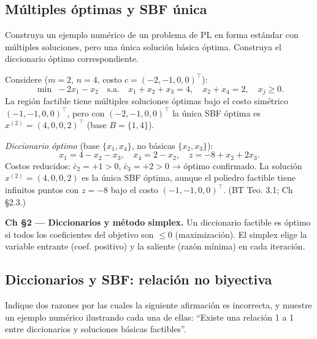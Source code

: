 \documentclass[12pt]{article}
\theoremstyle{plain}
\begin{document}
\bigskip

\subsection{Múltiples óptimas y SBF única}

Construya un ejemplo numérico de un problema de PL en forma estándar con múltiples
soluciones, pero una única solución básica óptima. Construya el diccionario óptimo
correspondiente.

\begin{solucion}

Considere ($m=2$, $n=4$, costo $c=(-2,-1,0,0)^\top$):
\[
\min\; -2x_1 - x_2 \quad\text{s.a.}\quad x_1+x_2+x_3=4,\quad x_2+x_4=2,\quad x_j\geq 0.
\]
La región factible tiene múltiples soluciones óptimas bajo el costo simétrico $(-1,-1,0,0)^\top$, pero con $(-2,-1,0,0)^\top$ la única SBF óptima es $x^{(2)}=(4,0,0,2)^\top$ (base $B=\{1,4\}$).

\noindent\textit{Diccionario óptimo} (base $\{x_1,x_4\}$, no básicas $\{x_2,x_3\}$):
\[
x_1 = 4 - x_2 - x_3, \quad x_4 = 2 - x_2, \quad z = -8 + x_2 + 2x_3.
\]
Costos reducidos: $\bar{c}_2 = +1 > 0$, $\bar{c}_3 = +2 > 0$ → óptimo confirmado. La solución $x^{(2)}=(4,0,0,2)$ es la única SBF óptima, aunque el poliedro factible tiene infinitos puntos con $z=-8$ bajo el costo $(-1,-1,0,0)^\top$. (BT Teo. 3.1; Ch §2.3.)

\end{solucion}

\begin{teofund}
\textbf{Ch §2 — Diccionarios y método simplex.} Un diccionario factible es óptimo si todos los coeficientes del objetivo son $\leq 0$ (maximización). El simplex elige la variable entrante (coef. positivo) y la saliente (razón mínima) en cada iteración.
\end{teofund}

\bigskip

\subsection{Diccionarios y SBF: relación no biyectiva}

Indique dos razones por las cuales la siguiente afirmación es incorrecta, y muestre un
ejemplo numérico ilustrando cada una de ellas: ``Existe una relación 1 a 1 entre
diccionarios y soluciones básicas factibles''.
\end{document}
